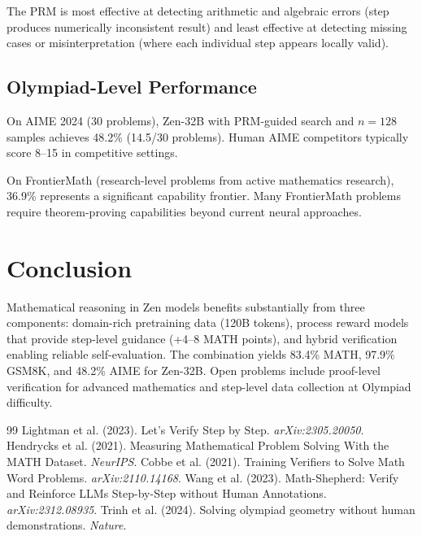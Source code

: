 \documentclass[11pt,a4paper]{article}
\begin{document}
The PRM is most effective at detecting arithmetic and algebraic errors (step produces
numerically inconsistent result) and least effective at detecting missing cases or
misinterpretation (where each individual step appears locally valid).

\subsection{Olympiad-Level Performance}

On AIME 2024 (30 problems), Zen-32B with PRM-guided search and $n=128$ samples
achieves 48.2\% (14.5/30 problems). Human AIME competitors typically score 8--15
in competitive settings.

On FrontierMath (research-level problems from active mathematics research), 36.9\%
represents a significant capability frontier. Many FrontierMath problems require
theorem-proving capabilities beyond current neural approaches.

\section{Conclusion}

Mathematical reasoning in Zen models benefits substantially from three components:
domain-rich pretraining data (120B tokens), process reward models that provide
step-level guidance (+4--8 MATH points), and hybrid verification enabling reliable
self-evaluation. The combination yields 83.4\% MATH, 97.9\% GSM8K, and 48.2\% AIME
for Zen-32B. Open problems include proof-level verification for advanced mathematics
and step-level data collection at Olympiad difficulty.


\begin{thebibliography}{99}
 Lightman et al. (2023). Let's Verify Step by Step. \textit{arXiv:2305.20050}.
 Hendrycks et al. (2021). Measuring Mathematical Problem Solving With the MATH Dataset. \textit{NeurIPS}.
 Cobbe et al. (2021). Training Verifiers to Solve Math Word Problems. \textit{arXiv:2110.14168}.
 Wang et al. (2023). Math-Shepherd: Verify and Reinforce LLMs Step-by-Step without Human Annotations. \textit{arXiv:2312.08935}.
 Trinh et al. (2024). Solving olympiad geometry without human demonstrations. \textit{Nature}.
\end{thebibliography}
\end{document}

